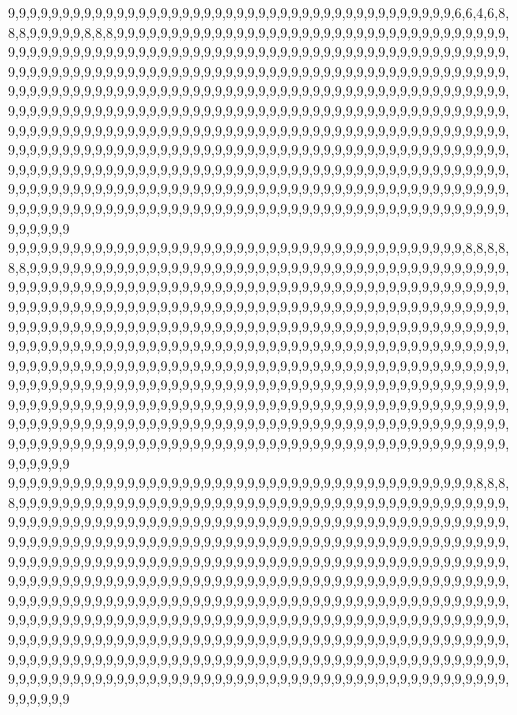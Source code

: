 9,9,9,9,9,9,9,9,9,9,9,9,9,9,9,9,9,9,9,9,9,9,9,9,9,9,9,9,9,9,9,9,9,9,9,9,9,9,9,9,9,6,6,4,6,8,8,8,9,9,9,9,9,8,8,8,9,9,9,9,9,9,9,9,9,9,9,9,9,9,9,9,9,9,9,9,9,9,9,9,9,9,9,9,9,9,9,9,9,9,9,9,9,9,9,9,9,9,9,9,9,9,9,9,9,9,9,9,9,9,9,9,9,9,9,9,9,9,9,9,9,9,9,9,9,9,9,9,9,9,9,9,9,9,9,9,9,9,9,9,9,9,9,9,9,9,9,9,9,9,9,9,9,9,9,9,9,9,9,9,9,9,9,9,9,9,9,9,9,9,9,9,9,9,9,9,9,9,9,9,9,9,9,9,9,9,9,9,9,9,9,9,9,9,9,9,9,9,9,9,9,9,9,9,9,9,9,9,9,9,9,9,9,9,9,9,9,9,9,9,9,9,9,9,9,9,9,9,9,9,9,9,9,9,9,9,9,9,9,9,9,9,9,9,9,9,9,9,9,9,9,9,9,9,9,9,9,9,9,9,9,9,9,9,9,9,9,9,9,9,9,9,9,9,9,9,9,9,9,9,9,9,9,9,9,9,9,9,9,9,9,9,9,9,9,9,9,9,9,9,9,9,9,9,9,9,9,9,9,9,9,9,9,9,9,9,9,9,9,9,9,9,9,9,9,9,9,9,9,9,9,9,9,9,9,9,9,9,9,9,9,9,9,9,9,9,9,9,9,9,9,9,9,9,9,9,9,9,9,9,9,9,9,9,9,9,9,9,9,9,9,9,9,9,9,9,9,9,9,9,9,9,9,9,9,9,9,9,9,9,9,9,9,9,9,9,9,9,9,9,9,9,9,9,9,9,9,9,9,9,9,9,9,9,9,9,9,9,9,9,9,9,9,9,9,9,9,9,9,9,9,9,9,9,9,9,9,9,9,9,9,9,9,9,9,9,9,9,9,9,9,9,9,9,9,9,9,9,9,9,9,9,9,9,9,9,9,9,9,9,9,9,9,9,9,9,9,9,9,9,9,9,9,9,9,9,9,9,9,9,9,9,9,9,9,9,9,9,9,9,9,9,9,9,9,9,9,9,9,9,9,9
9,9,9,9,9,9,9,9,9,9,9,9,9,9,9,9,9,9,9,9,9,9,9,9,9,9,9,9,9,9,9,9,9,9,9,9,9,9,9,9,9,9,8,8,8,8,8,8,9,9,9,9,9,9,9,9,9,9,9,9,9,9,9,9,9,9,9,9,9,9,9,9,9,9,9,9,9,9,9,9,9,9,9,9,9,9,9,9,9,9,9,9,9,9,9,9,9,9,9,9,9,9,9,9,9,9,9,9,9,9,9,9,9,9,9,9,9,9,9,9,9,9,9,9,9,9,9,9,9,9,9,9,9,9,9,9,9,9,9,9,9,9,9,9,9,9,9,9,9,9,9,9,9,9,9,9,9,9,9,9,9,9,9,9,9,9,9,9,9,9,9,9,9,9,9,9,9,9,9,9,9,9,9,9,9,9,9,9,9,9,9,9,9,9,9,9,9,9,9,9,9,9,9,9,9,9,9,9,9,9,9,9,9,9,9,9,9,9,9,9,9,9,9,9,9,9,9,9,9,9,9,9,9,9,9,9,9,9,9,9,9,9,9,9,9,9,9,9,9,9,9,9,9,9,9,9,9,9,9,9,9,9,9,9,9,9,9,9,9,9,9,9,9,9,9,9,9,9,9,9,9,9,9,9,9,9,9,9,9,9,9,9,9,9,9,9,9,9,9,9,9,9,9,9,9,9,9,9,9,9,9,9,9,9,9,9,9,9,9,9,9,9,9,9,9,9,9,9,9,9,9,9,9,9,9,9,9,9,9,9,9,9,9,9,9,9,9,9,9,9,9,9,9,9,9,9,9,9,9,9,9,9,9,9,9,9,9,9,9,9,9,9,9,9,9,9,9,9,9,9,9,9,9,9,9,9,9,9,9,9,9,9,9,9,9,9,9,9,9,9,9,9,9,9,9,9,9,9,9,9,9,9,9,9,9,9,9,9,9,9,9,9,9,9,9,9,9,9,9,9,9,9,9,9,9,9,9,9,9,9,9,9,9,9,9,9,9,9,9,9,9,9,9,9,9,9,9,9,9,9,9,9,9,9,9,9,9,9,9,9,9,9,9,9,9,9,9,9,9,9,9,9,9,9,9,9,9,9,9,9,9,9,9,9,9,9,9,9,9,9,9,9,9,9,9,9,9,9,9,9,9,9
9,9,9,9,9,9,9,9,9,9,9,9,9,9,9,9,9,9,9,9,9,9,9,9,9,9,9,9,9,9,9,9,9,9,9,9,9,9,9,9,9,9,9,8,8,8,8,9,9,9,9,9,9,9,9,9,9,9,9,9,9,9,9,9,9,9,9,9,9,9,9,9,9,9,9,9,9,9,9,9,9,9,9,9,9,9,9,9,9,9,9,9,9,9,9,9,9,9,9,9,9,9,9,9,9,9,9,9,9,9,9,9,9,9,9,9,9,9,9,9,9,9,9,9,9,9,9,9,9,9,9,9,9,9,9,9,9,9,9,9,9,9,9,9,9,9,9,9,9,9,9,9,9,9,9,9,9,9,9,9,9,9,9,9,9,9,9,9,9,9,9,9,9,9,9,9,9,9,9,9,9,9,9,9,9,9,9,9,9,9,9,9,9,9,9,9,9,9,9,9,9,9,9,9,9,9,9,9,9,9,9,9,9,9,9,9,9,9,9,9,9,9,9,9,9,9,9,9,9,9,9,9,9,9,9,9,9,9,9,9,9,9,9,9,9,9,9,9,9,9,9,9,9,9,9,9,9,9,9,9,9,9,9,9,9,9,9,9,9,9,9,9,9,9,9,9,9,9,9,9,9,9,9,9,9,9,9,9,9,9,9,9,9,9,9,9,9,9,9,9,9,9,9,9,9,9,9,9,9,9,9,9,9,9,9,9,9,9,9,9,9,9,9,9,9,9,9,9,9,9,9,9,9,9,9,9,9,9,9,9,9,9,9,9,9,9,9,9,9,9,9,9,9,9,9,9,9,9,9,9,9,9,9,9,9,9,9,9,9,9,9,9,9,9,9,9,9,9,9,9,9,9,9,9,9,9,9,9,9,9,9,9,9,9,9,9,9,9,9,9,9,9,9,9,9,9,9,9,9,9,9,9,9,9,9,9,9,9,9,9,9,9,9,9,9,9,9,9,9,9,9,9,9,9,9,9,9,9,9,9,9,9,9,9,9,9,9,9,9,9,9,9,9,9,9,9,9,9,9,9,9,9,9,9,9,9,9,9,9,9,9,9,9,9,9,9,9,9,9,9,9,9,9,9,9,9,9,9,9,9,9,9,9,9,9,9,9,9,9,9,9,9,9,9,9,9,9,9,9,9,9,9
